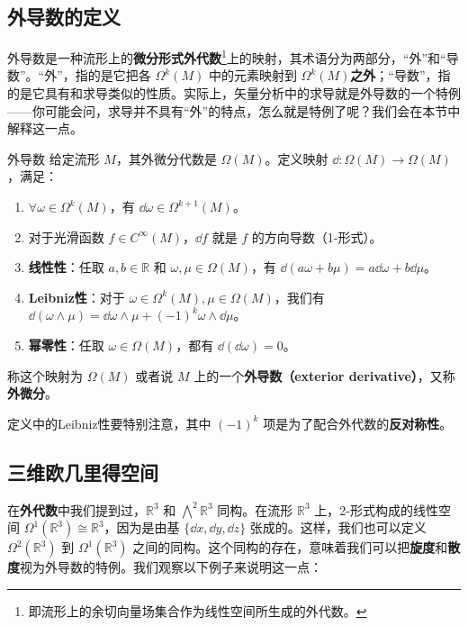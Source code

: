 

\subsection{外导数的定义}

外导数是一种流形上的\textbf{微分形式外代数}\footnote{即流形上的余切向量场集合作为线性空间所生成的外代数。}上的映射，其术语分为两部分，“外”和“导数”。“外”，指的是它把各 $\Omega^k(M)$ 中的元素映射到 $\Omega^k(M)$\textbf{之外}；“导数”，指的是它具有和求导类似的性质。实际上，矢量分析中的求导就是外导数的一个特例——你可能会问，求导并不具有“外”的特点，怎么就是特例了呢？我们会在本节中解释这一点。

\begin{definition}{外导数}\label{def_ExtDer_1}
给定流形 $M$，其外微分代数是 $\Omega (M)$。定义映射 $\dd:\Omega (M)\rightarrow\Omega (M)$，满足：
\begin{enumerate}
\item $\forall \omega\in\Omega^k(M)$，有 $\dd \omega\in\Omega^{k+1}(M)$。
\item 对于光滑函数 $f\in C^\infty(M)$，$\dd f$ 就是 $f$ 的方向导数（1-形式）。
\item \textbf{线性性}：任取 $a, b\in \mathbb{R}$ 和 $\omega, \mu\in\Omega(M)$，有 $\dd(a\omega+b\mu)=a\dd\omega+b\dd\mu$。
\item \textbf{Leibniz性}：对于 $\omega\in\Omega^k(M), \mu\in\Omega(M)$，我们有 $\dd(\omega\wedge\mu)=\dd\omega\wedge\mu+(-1)^k\omega\wedge\dd\mu$。
\item \textbf{幂零性}：任取 $\omega\in\Omega(M)$，都有 $\dd(\dd\omega)=0$。
\end{enumerate}
称这个映射为 $\Omega (M)$ 或者说 $M$ 上的一个\textbf{外导数（exterior derivative）}，又称\textbf{外微分}。
\end{definition}

定义中的Leibniz性要特别注意，其中 $(-1)^k$ 项是为了配合外代数的\textbf{反对称性}。



\subsection{三维欧几里得空间}

在\textbf{外代数}中我们提到过，$\mathbb{R}^3$ 和 $\bigwedge^2\mathbb{R}^3$ 同构。在流形 $\mathbb{R}^3$ 上，2-形式构成的线性空间 $\Omega^1(\mathbb{R}^3)\cong\mathbb{R}^3$，因为是由基 $\{\dd x, \dd y, \dd z\}$ 张成的。这样，我们也可以定义 $\Omega^2(\mathbb{R}^3)$ 到 $\Omega^1(\mathbb{R}^3)$ 之间的同构。这个同构的存在，意味着我们可以把\textbf{旋度}和\textbf{散度}视为外导数的特例。我们观察以下例子来说明这一点：

